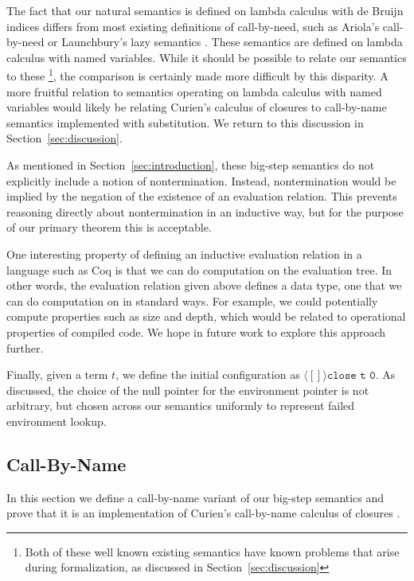 The fact that our natural semantics is defined on lambda calculus with de Bruijn
indices differs from most existing definitions of call-by-need, such as
Ariola's call-by-need \cite{ariola1995call} or Launchbury's lazy semantics
\cite{launchburynatural}. These semantics are defined on lambda calculus with named
variables. While it should be possible to relate our semantics to these
\footnote{Both of these well known existing semantics have known problems that
arise during formalization, as discussed in Section~\ref{sec:discussion}}, the
comparison is certainly made more difficult by this disparity. A more fruitful
relation to semantics operating on lambda calculus with named variables would
likely be relating Curien's calculus of closures to call-by-name semantics
implemented with substitution. We return to this discussion in
Section~\ref{sec:discussion}.

As mentioned in Section~\ref{sec:introduction}, these big-step semantics do not
explicitly include a notion of nontermination. Instead, nontermination would be
implied by the negation of the existence of an evaluation relation. This
prevents reasoning directly about nontermination in an inductive way, but for
the purpose of our primary theorem this is acceptable. 

One interesting property of defining an inductive evaluation relation in a
language such as Coq is that we can do computation on the evaluation tree. In other
words, the evaluation relation given above defines a data type, one that we can
do computation on in standard ways. For example, we could potentially compute
properties such as size and depth, which would be related to operational properties
of compiled code. We hope in future work to explore this approach further.

Finally, given a term $t$, we define the initial configuration as $\langle [] \rangle
\texttt{close t 0}$. As discussed, the choice of the null pointer for the environment
pointer is not arbitrary, but chosen across our semantics uniformly to represent
failed environment lookup. 

\subsection{Call-By-Name}

In this section we define a call-by-name variant of our big-step semantics and
prove that it is an implementation of Curien's call-by-name calculus of
closures \cite{curien1991abstract}. 

